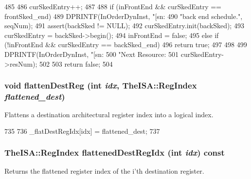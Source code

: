 \begin{DoxyCode}
485     {
486         curSkedEntry++;
487 
488         if (inFrontEnd && curSkedEntry == frontSked_end) {
489             DPRINTF(InOrderDynInst, "[sn:%
490                   "back end schedule.\n", seqNum);
491           assert(backSked != NULL);
492           curSkedEntry.init(backSked);
493           curSkedEntry = backSked->begin();
494           inFrontEnd = false;
495         } else if (!inFrontEnd && curSkedEntry == backSked_end) {
496             return true;
497         }
498 
499         DPRINTF(InOrderDynInst, "[sn:%
500                 "Next Resource: %
501                 curSkedEntry->resNum);
502 
503         return false;
504     }
\end{DoxyCode}
\hypertarget{classInOrderDynInst_aa63107f986e5c741f58413c6643298fb}{
\subsubsection[{flattenDestReg}]{\setlength{\rightskip}{0pt plus 5cm}void flattenDestReg (int {\em idx}, \/  TheISA::RegIndex {\em flattened\_\-dest})}}
\label{classInOrderDynInst_aa63107f986e5c741f58413c6643298fb}
Flattens a destination architectural register index into a logical index. 


\begin{DoxyCode}
735     {
736         _flatDestRegIdx[idx] = flattened_dest;
737     }
\end{DoxyCode}
\hypertarget{classInOrderDynInst_ae669db55c176447543f27f35c1cd3ae5}{
\subsubsection[{flattenedDestRegIdx}]{\setlength{\rightskip}{0pt plus 5cm}TheISA::RegIndex flattenedDestRegIdx (int {\em idx}) const}}
\label{classInOrderDynInst_ae669db55c176447543f27f35c1cd3ae5}
Returns the flattened register index of the i'th destination register. 


